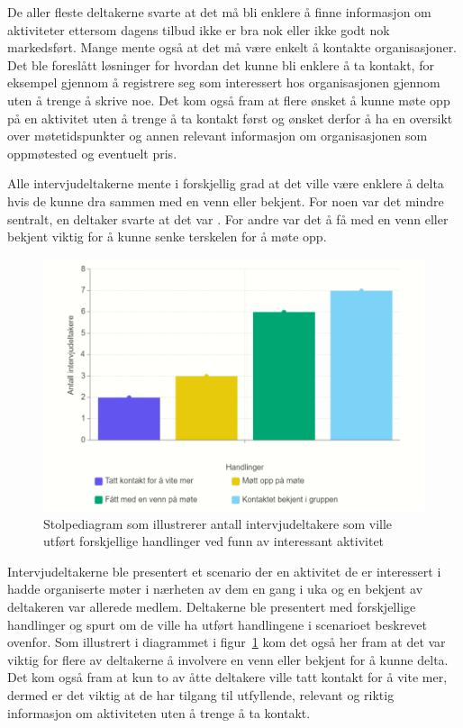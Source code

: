 De aller fleste deltakerne svarte at det må bli enklere å finne informasjon om aktiviteter ettersom dagens tilbud ikke er bra nok eller ikke godt nok markedsført. Mange mente også at det må være enkelt å kontakte organisasjoner. Det ble foreslått løsninger for hvordan det kunne bli enklere å ta kontakt, for eksempel gjennom å registrere seg som interessert hos organisasjonen gjennom uten å trenge å skrive noe. Det kom også fram at flere ønsket å kunne møte opp på en aktivitet uten å trenge å ta kontakt først og ønsket derfor å ha en oversikt over møtetidspunkter og annen relevant informasjon om organisasjonen som oppmøtested og eventuelt pris.

Alle intervjudeltakerne mente i forskjellig grad at det ville være enklere å delta hvis de kunne dra sammen med en venn eller bekjent. For noen var det mindre sentralt, en deltaker svarte at det var . For andre var det å få med en venn eller bekjent viktig for å kunne senke terskelen for å møte opp.

\begin{figure}[H]
\includegraphics[width=\textwidth]{Illustrasjoner/diagram-handlinger.png}
\caption{Stolpediagram som illustrerer antall intervjudeltakere som ville utført forskjellige handlinger ved funn av interessant aktivitet}
\label{fig:diagram-handlinger}
\end{figure}

Intervjudeltakerne ble presentert et scenario der en aktivitet de er interessert i hadde organiserte møter i nærheten av dem en gang i uka og en bekjent av deltakeren var allerede medlem. Deltakerne ble presentert med forskjellige handlinger og spurt om de ville ha utført handlingene i scenarioet beskrevet ovenfor. Som illustrert i diagrammet i figur~\ref{fig:diagram-handlinger} kom det også her fram at det var viktig for flere av deltakerne å involvere en venn eller bekjent for å kunne delta. Det kom også fram at kun to av åtte deltakere ville tatt kontakt for å vite mer, dermed er det viktig at de har tilgang til utfyllende, relevant og riktig informasjon om aktiviteten uten å trenge å ta kontakt.


